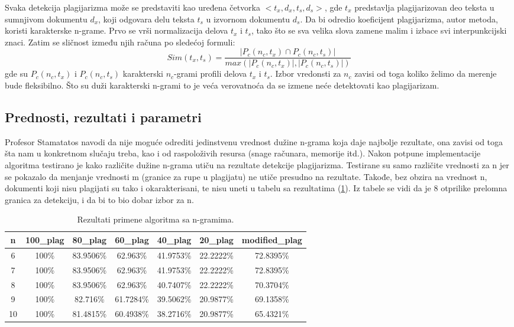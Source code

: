 \documentclass[a4paper]{article}
\begin{document}
Svaka detekcija plagijarizma može se predstaviti kao uređena četvorka \( <t_{x}, d_{x}, t_{s}, d_{s}>\), gde \(t_{x}\) predstavlja  plagijarizovan deo teksta u sumnjivom dokumentu \(d_{x}\), koji odgovara delu teksta \(t_{s}\) u izvornom dokumentu \(d_{s}\). Da bi odredio  koeficijent plagijarizma, autor metoda, koristi karakterske n-grame. Prvo se vrši normalizacija delova \(t_{x}\) i \(t_{s}\), tako što se  sva velika slova zamene malim i izbace svi interpunkcijski znaci. Zatim se sličnost između njih računa po sledećoj formuli:
\[ Sim(t_{x}, t_{s}) = \frac{|P_{c}(n_{c}, t_{x}) \cap P_{c}(n_{c}, t_{s})|}{max(|P_{c}(n_{c}, t_{x})|,|P_{c}(n_{c}, t_{s})|)} \]			
gde su \(P_{c}(n_{c},t_{x})\) i \(P_{c}(n_{c},t_{s})\) karakterski \(n_{c}\)-grami profili delova \(t_{x}\) i \(t_{s}\). Izbor vredonsti za \(n_{c}\) zavisi od toga koliko želimo da merenje bude fleksibilno. Što su duži karakterski n-grami to je veća verovatnoća da se izmene neće detektovati kao plagijarizam.

\subsection{Prednosti, rezultati i parametri}
\label{subsec:Prednosti, rezultati i parametri}

Profesor Stamatatos navodi da nije moguće odrediti jedinstvenu vrednost dužine n-grama koja daje najbolje rezultate, ona zavisi od toga šta nam u konkretnom slučaju treba, kao i od raspoloživih resursa (snage računara, memorije itd.). Nakon potpune implementacije algoritma testirano je kako različite dužine n-grama utiču na rezultate detekcije plagijarizma. Testirane su samo različite vrednosti za n jer se pokazalo da menjanje vrednosti m (granice za rupe u plagijatu) ne utiče presudno na rezultate. Takođe, bez obzira na vrednost n, dokumenti koji nisu plagijati su tako i okarakterisani, te nisu uneti u tabelu sa rezultatima (\ref{tab:tabela2}). Iz tabele se vidi da je 8 otprilike prelomna granica za detekciju, i da bi to bio dobar izbor za n.

\begin{table}[h!]
\begin{center}
\caption{Rezultati primene algoritma sa n-gramima.}
\begin{tabular}{|c|c|c|c|c|c|c|} \hline
n & 100\_plag & 80\_plag & 60\_plag & 40\_plag & 20\_plag & modified\_plag \\ \hline
6 & 100\% & 83.9506\% & 62.963\% & 41.9753\% & 22.2222\% & 72.8395\% \\ \hline
7 & 100\% & 83.9506\% & 62.963\% & 41.9753\% & 22.2222\% & 72.8395\% \\ \hline
8 & 100\% & 83.9506\% & 62.963\% & 40.7407\% & 22.2222\% & 70.3704\% \\ \hline
9 & 100\% & 82.716\% & 61.7284\% & 39.5062\% & 20.9877\% & 69.1358\% \\ \hline
10 & 100\% & 81.4815\% & 60.4938\% & 38.2716\% & 20.9877\% & 65.4321\% \\ \hline
\end{tabular}
\label{tab:tabela2}
\end{center}
\end{table}
\end{document}

